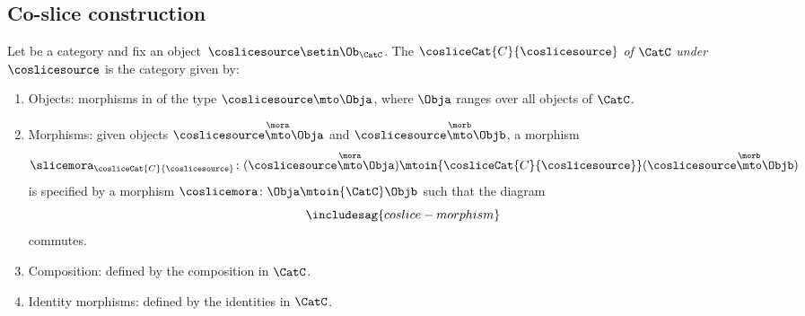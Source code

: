 \subsection{Co-slice construction}

\begin{ctdefinition}
    \label{def:coslice-category}

    Let \CatC be a category and fix an object~$\coslicesource \setin \Ob_\CatC$.
    The  $\cosliceCat{C}{\coslicesource}$ \emph{of} $\CatC$ \emph{under} $\coslicesource$ is the category given by:

    \constit

    \begin{enumerate}
        \item Objects: morphisms in \CatC of the type $\coslicesource \mto \Obja$, where $\Obja$ ranges over all objects of $\CatC$.
        \item Morphisms: given objects $\coslicesource \overset{\mora}{\mto} \Obja$ and $\coslicesource  \overset{\morb}{\mto} \Objb$, a morphism
              \begin{equation}
                  \slicemora_{\cosliceCat{C}{\coslicesource}} \colon (\coslicesource \overset{\mora}{\mto} \Obja)
                  \mtoin{\cosliceCat{C}{\coslicesource}}
                  (\coslicesource \overset{\morb}{\mto} \Objb)
              \end{equation}
              is specified by a morphism $\coslicemora \colon \Obja \mtoin{\CatC} \Objb$ such that the diagram
              \begin{equation}\label{eq:coslice-morphism}
                  \includesag{coslice-morphism}
              \end{equation}
              commutes.

        \item Composition: defined by the composition in $\CatC$.
        \item Identity morphisms: defined by the identities in $\CatC$.
    \end{enumerate}
\end{ctdefinition}


